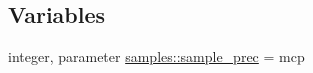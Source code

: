 \subsection*{Variables}
\begin{DoxyCompactItemize}
\item 
integer, parameter \mbox{\hyperlink{namespacesamples_ab1a059d29fb6ed2517c01f6aef7713d3}{samples\+::sample\+\_\+prec}} = mcp
\end{DoxyCompactItemize}
